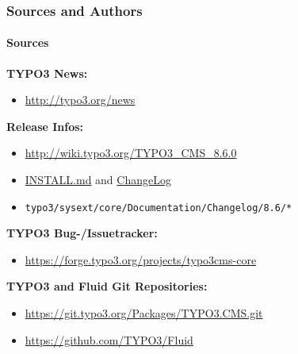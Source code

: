 \begin{frame}[fragile]
	\frametitle{Sources and Authors}
	\framesubtitle{Sources}

	\textbf{TYPO3 News:}
		\begin{itemize}\smaller
			\item \url{http://typo3.org/news}
		\end{itemize}

	\textbf{Release Infos:}
		\begin{itemize}\smaller
			\item \url{http://wiki.typo3.org/TYPO3_CMS_8.6.0}
			\item \href{https://github.com/TYPO3/TYPO3.CMS/blob/master/INSTALL.md}{INSTALL.md}
				and \href{https://github.com/TYPO3/TYPO3.CMS/tree/master/typo3/sysext/core/Documentation/Changelog}{ChangeLog}
			\item \texttt{typo3/sysext/core/Documentation/Changelog/8.6/*}
		\end{itemize}

	\textbf{TYPO3 Bug-/Issuetracker:}
		\begin{itemize}\smaller
			\item \url{https://forge.typo3.org/projects/typo3cms-core}
		\end{itemize}

	\textbf{TYPO3 and Fluid Git Repositories:}
		\begin{itemize}\smaller
			\item \url{https://git.typo3.org/Packages/TYPO3.CMS.git}
			\item \url{https://github.com/TYPO3/Fluid}
		\end{itemize}

\end{frame}


